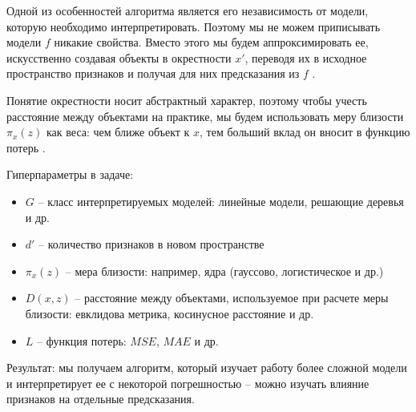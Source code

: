 Одной из особенностей алгоритма является его независимость от модели, которую необходимо интерпретировать. Поэтому мы не можем приписывать модели $f$ никакие свойства. Вместо этого мы будем аппроксимировать ее, искусственно создавая объекты в окрестности $x'$, переводя их в исходное пространство признаков и получая для них предсказания из $f$ \cite{lime}.

Понятие окрестности носит абстрактный характер, поэтому чтобы учесть расстояние между объектами на практике, мы будем использовать меру близости $\pi_x(z)$ как веса: чем ближе объект к $x$, тем больший вклад он вносит в функцию потерь \cite{lime}.

Гиперпараметры в задаче:\\[-8mm]
\begin{itemize}
	\item $G$ -- класс интерпретируемых моделей: линейные модели, решающие деревья и др.\\[-6mm]
	\item $d'$ -- количество признаков в новом пространстве
	\item $\pi_x(z)$ -- мера близости: например, ядра (гауссово, логистическое и др.)\\[-6mm]
	\item $D(x,z)$ -- расстояние между объектами, используемое при расчете меры близости: евклидова метрика, косинусное расстояние и др.\\[-6mm]
	\item $L$ -- функция потерь: $MSE$, $MAE$ и др.\\[-6mm]
\end{itemize}


Результат: мы получаем алгоритм, который изучает работу более сложной модели и интерпретирует ее с некоторой погрешностью -- можно изучать влияние признаков на отдельные предсказания.

